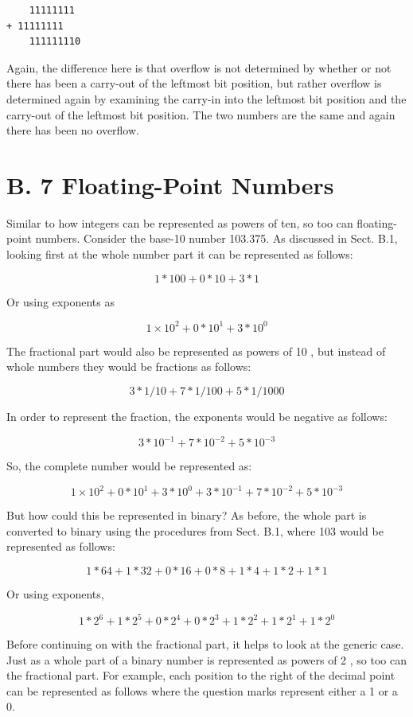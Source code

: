 \documentclass[10pt]{book}
\begin{document}
\begin{verbatim}
    11111111
+ 11111111
    111111110
\end{verbatim}

Again, the difference here is that overflow is not determined by whether or not there has been a carry-out of the leftmost bit position, but rather overflow is determined again by examining the carry-in into the leftmost bit position and the carry-out of the leftmost bit position. The two numbers are the same and again there has been no overflow.

\section*{B. 7 Floating-Point Numbers}
Similar to how integers can be represented as powers of ten, so too can floating-point numbers. Consider the base-10 number 103.375. As discussed in Sect. B.1, looking first at the whole number part it can be represented as follows:

$$
1 * 100+0 * 10+3 * 1
$$

Or using exponents as

$$
1 \times 10^{2}+0 * 10^{1}+3 * 10^{0}
$$

The fractional part would also be represented as powers of 10 , but instead of whole numbers they would be fractions as follows:

$$
3 * 1 / 10+7 * 1 / 100+5 * 1 / 1000
$$

In order to represent the fraction, the exponents would be negative as follows:

$$
3 * 10^{-1}+7 * 10^{-2}+5 * 10^{-3}
$$

So, the complete number would be represented as:

$$
1 \times 10^{2}+0 * 10^{1}+3 * 10^{0}+3 * 10^{-1}+7 * 10^{-2}+5 * 10^{-3}
$$

But how could this be represented in binary? As before, the whole part is converted to binary using the procedures from Sect. B.1, where 103 would be represented as follows:

$$
1 * 64+1 * 32+0 * 16+0 * 8+1 * 4+1 * 2+1 * 1
$$

Or using exponents,

$$
1 * 2^{6}+1 * 2^{5}+0 * 2^{4}+0 * 2^{3}+1 * 2^{2}+1 * 2^{1}+1 * 2^{0}
$$

Before continuing on with the fractional part, it helps to look at the generic case. Just as a whole part of a binary number is represented as powers of 2 , so too can the fractional part. For example, each position to the right of the decimal point can be represented as follows where the question marks represent either a 1 or a 0.
\end{document}
